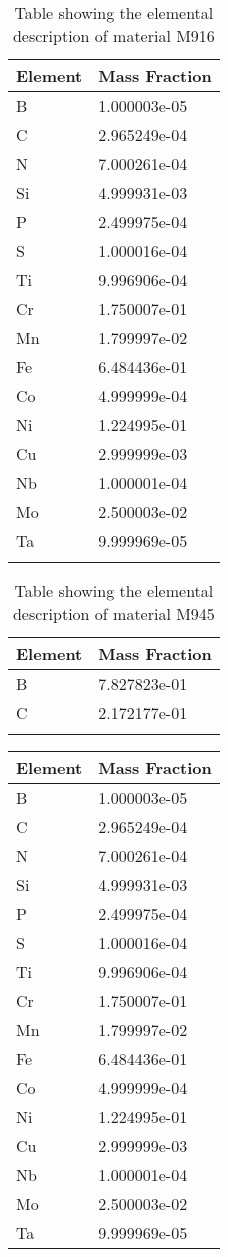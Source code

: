 \begin{centering}
\begin{longtable}[ht!]
\caption{Table showing the elemental description of material M915}
\label{table:material_UppExShield}
\end{longtable}
\clearpage

\begin{longtable}[ht!]
{ p{} | p{} }
\hline
Element & Mass Fraction\\
\hline
B &  1.000003e-05\\
C &  2.965249e-04\\
N &  7.000261e-04\\
Si &  4.999931e-03\\
P &  2.499975e-04\\
S &  1.000016e-04\\
Ti &  9.996906e-04\\
Cr &  1.750007e-01\\
Mn &  1.799997e-02\\
Fe &  6.484436e-01\\
Co &  4.999999e-04\\
Ni &  1.224995e-01\\
Cu &  2.999999e-03\\
Nb &  1.000001e-04\\
Mo &  2.500003e-02\\
Ta &  9.999969e-05\\

\caption{Table showing the elemental description of material M916}
\label{table:material_Cryopump}
\end{longtable}
\clearpage

\begin{longtable}[ht!]
{ p{} | p{} }
\hline
Element & Mass Fraction\\
\hline
B &  7.827823e-01\\
C &  2.172177e-01\\
\caption{Table showing the elemental description of material M945}
\label{table:material_EPPCN}
\end{longtable}
\clearpage

\begin{longtable}[ht!]
{ p{} | p{} }
\hline
Element & Mass Fraction\\
\hline
B &  1.000003e-05\\
C &  2.965249e-04\\
N &  7.000261e-04\\
Si &  4.999931e-03\\
P &  2.499975e-04\\
S &  1.000016e-04\\
Ti &  9.996906e-04\\
Cr &  1.750007e-01\\
Mn &  1.799997e-02\\
Fe &  6.484436e-01\\
Co &  4.999999e-04\\
Ni &  1.224995e-01\\
Cu &  2.999999e-03\\
Nb &  1.000001e-04\\
Mo &  2.500003e-02\\
Ta &  9.999969e-05\\


\end{longtable}
\end{centering}

